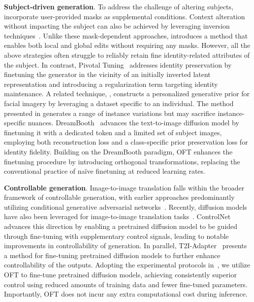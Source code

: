 \textbf{Subject-driven generation}. To address the challenge of altering subjects, \cite{avrahami2022blended,nichol2022glide} incorporate user-provided masks as supplemental conditions. Context alteration without impacting the subject can also be achieved by leveraging inversion techniques~\cite{choi2021ilvr,dhariwal2021diffusion,ramesh2022hierarchical,gal2022image}. Unlike these mask-dependent approaches, \cite{hertz2022prompt} introduces a method that enables both local and global edits without requiring any masks. However, all the above strategies often struggle to reliably retain fine identity-related attributes of the subject. In contrast, Pivotal Tuning~\cite{roich2022pivotal} addresses identity preservation by finetuning the generator in the vicinity of an initially inverted latent representation and introducing a regularization term targeting identity maintenance. A related technique, \cite{nitzan2022mystyle}, constructs a personalized generative prior for facial imagery by leveraging a dataset specific to an individual. The method presented in \cite{casanova2021instance} generates a range of instance variations but may sacrifice instance-specific nuances. DreamBooth~\cite{ruiz2023dreambooth} advances the text-to-image diffusion model by finetuning it with a dedicated token and a limited set of subject images, employing both reconstruction loss and a class-specific prior preservation loss for identity fidelity. Building on the DreamBooth paradigm, OFT enhances the finetuning procedure by introducing orthogonal transformations, replacing the conventional practice of naïve finetuning at reduced learning rates.

\textbf{Controllable generation}. Image-to-image translation falls within the broader framework of controllable generation, with earlier approaches predominantly utilizing conditional generative adversarial networks~\cite{isola2017image,zhu2017toward,wang2018high,park2019semantic,choi2018stargan}. Recently, diffusion models have also been leveraged for image-to-image translation tasks~\cite{saharia2022palette,voynov2022sketch,wang2022pretraining}. ControlNet~\cite{zhang2023adding} advances this direction by enabling a pretrained diffusion model to be guided through fine-tuning with supplementary control signals, leading to notable improvements in controllability of generation. In parallel, T2I-Adapter~\cite{mou2023t2i} presents a method for fine-tuning pretrained diffusion models to further enhance controllability of the outputs. Adopting the experimental protocols in~\cite{zhang2023adding,mou2023t2i}, we utilize OFT to fine-tune pretrained diffusion models, achieving consistently superior control using reduced amounts of training data and fewer fine-tuned parameters. Importantly, OFT does not incur any extra computational cost during inference.

